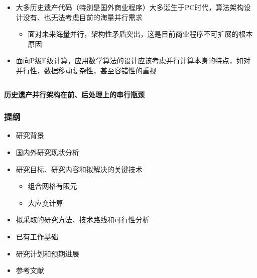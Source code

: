 \documentclass[mathserif]{beamer}
\begin{document}
\begin{CJK}{UTF8}{gkai}
\begin{frame}
\begin{columns}
			\begin{column}[pos]{0.6\textwidth}
				\begin{itemize}
		  			\item 大多历史遗产代码（特别是国外商业程序）大多诞生于PC时代，算法架构设计没有、也无法考虑目前的海量并行需求
		  		\begin{itemize}
					\item 面对未来海量并行，架构性矛盾突出，这是目前商业程序不可扩展的根本原因
		  		\end{itemize}
		  		\item 面向P级E级计算，应用数学算法的设计应该考虑并行计算本身的特点，如对并行性，数据移动复杂性，甚至容错性的重视
		\end{itemize}
			\end{column}
		\end{columns}
		\begin{block}{}
			\color{red}\bf 历史遗产并行架构在前、后处理上的串行瓶颈
		\end{block}
	\end{frame}

	    \begin{frame}
        \frametitle{提纲}
        \begin{itemize}
            \color{gray} 
            \item 研究背景
            \item {\color{blue}国内外研究现状分析}
            \item 研究目标、研究内容和拟解决的关键技术 
		  	\begin{itemize}
		    		\color{gray}
		  		\item 组合网格有限元
				\item 大应变计算
		  	\end{itemize}
            \item 拟采取的研究方法、技术路线和可行性分析
            \item 已有工作基础
	    \item 研究计划和预期进展
            \item 参考文献
        \end{itemize}
	\end{frame}
	

\end{CJK}
\end{document}
